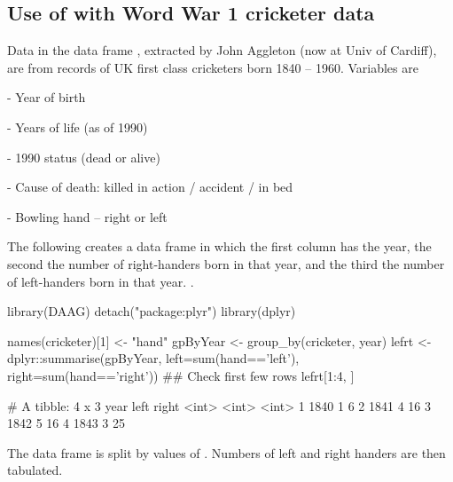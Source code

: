 \subsection{Use of  with Word War 1 cricketer data}

Data in the data frame , extracted by John Aggleton
(now at Univ of Cardiff), are from records of UK first class
cricketers born 1840 -- 1960.  Variables are
\begin{list}{}{
\setlength{\itemsep}{1pt}
\setlength{\parsep}{1pt}}
\item[-] Year of birth
\item[-] Years of life (as of 1990)
\item[-] 1990 status (dead or alive)
\item[-] Cause of death: killed in action / accident / in bed
\item[-] Bowling hand -- right or left
\end{list}
The following creates a data frame in which the first column has the
year, the second the number of right-handers born in that year, and
the third the number of left-handers born in that year.
.
\begin{Schunk}
\begin{Sinput}
library(DAAG)
detach("package:plyr")
library(dplyr)
\end{Sinput}
\begin{Sinput}
names(cricketer)[1] <- "hand"
gpByYear <- group_by(cricketer, year)
lefrt <- dplyr::summarise(gpByYear,
                          left=sum(hand=='left'),
                          right=sum(hand=='right'))
## Check first few rows
lefrt[1:4, ]
\end{Sinput}
\begin{Soutput}
# A tibble: 4 x 3
   year  left right
  <int> <int> <int>
1  1840     1     6
2  1841     4    16
3  1842     5    16
4  1843     3    25
\end{Soutput}
\end{Schunk}
The data frame is split by values of .  Numbers of left
and right handers are then tabulated.

